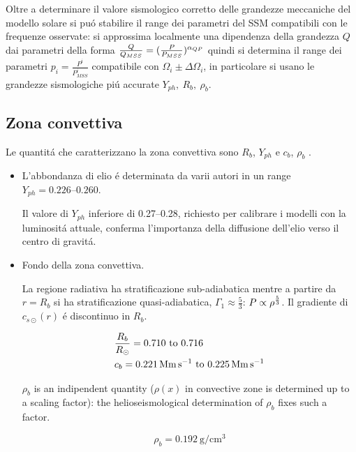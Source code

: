 \documentclass[../main.tex]{subfiles}
\begin{document}
Oltre a determinare il valore sismologico corretto delle grandezze meccaniche del modello solare si pu\'o stabilire il range dei parametri del SSM compatibili con le frequenze osservate: si approssima localmente una dipendenza della grandezza $Q$ dai parametri della forma $\frac{Q}{Q_{MSS}}=(\frac{P}{P_{MSS}})^{\alpha_{QP}}$ quindi si determina il range dei parametri $p_i=\frac{P^i}{P_{MSS}^i}$ compatibile con $\Omega_i\pm\Delta\Omega_i$, in particolare si usano le grandezze sismologiche pi\'u accurate $Y_{ph},\ R_b,\ \rho_b$.

\subsection{Zona convettiva}

Le quantit\'a che caratterizzano la zona convettiva sono $R_b$, $Y_{ph}$ e $c_b$, $\rho_b$ .

\begin{itemize}
\item L'abbondanza di elio \'e determinata da varii autori in un range $Y_{ph}=\numrange{0.226}{0.260}$.
    
Il valore di $Y_{ph}$ inferiore di \numrange{0.27}{0.28}, richiesto per calibrare i modelli con la luminosit\'a attuale, conferma l'importanza della diffusione dell'elio verso il centro di gravit\'a.
    
\item Fondo della zona convettiva.
 
La regione radiativa ha stratificazione sub-adiabatica mentre a partire da $r=R_b$ si ha stratificazione quasi-adiabatica,  $\Gamma_1\approx\frac{5}{3}$: $P\propto\rho^{\frac{5}{3}}$.
Il gradiente di $c_{s\odot}(r)$ \'e discontinuo in $R_b$.
    
\begin{align*}
&\frac{R_b}{\rsun{}}=\numrange{0.710}{0.716}\\
&c_b=\SIrange{0.221}{0.225}{\mega\meter\per\second}
\end{align*}


$\rho_b$ is an indipendent quantity ($\rho(x)$ in convective zone is determined up to a scaling factor): the helioseismological determination of $\rho_b$ fixes such a factor.

\begin{equation*}
\rho_b=\SI{0.192}{\gram\per\cubic\cm}
\end{equation*}
    
\end{itemize}
\end{document}
